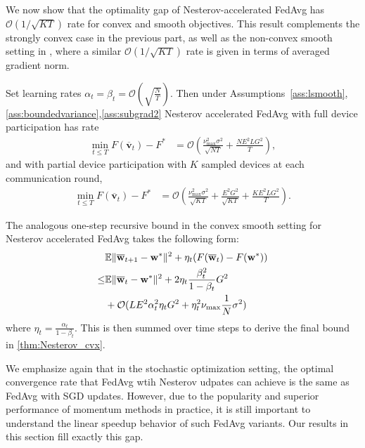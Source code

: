 We now show that the optimality gap of Nesterov-accelerated FedAvg has $\mathcal{O}(1/\sqrt{KT})$ rate for convex and smooth objectives. This result complements the strongly convex case in the previous
part, as well as the non-convex smooth setting in \cite{huo2020faster,yu2019linear,li2018federated},
where a similar $\mathcal{O}(1/\sqrt{KT})$ rate is given in terms
of averaged gradient norm. 
\begin{theorem}
	\label{thm:Nesterov_cvx}Set learning rates $\alpha_{t}=\beta_{t}=\mathcal{O}(\sqrt{\frac{N}{T}})$. Then under Assumptions~\ref{ass:lsmooth},\ref{ass:boundedvariance},\ref{ass:subgrad2} Nesterov accelerated FedAvg with
	full device participation has rate
	{\begin{align*}
		\min_{t\leq T}F(\overline{\mathbf{v}}_{t})-F^{\ast} & =\mathcal{O}\left(\frac{\nu_{\max}^{2}\sigma^{2}}{\sqrt{NT}}+\frac{NE^{2}LG^{2}}{T}\right),
		\end{align*}}
	and with partial device participation with $K$ sampled devices at
	each communication round, 
	{\begin{align*}
		\min_{t\leq T}F(\overline{\mathbf{v}}_{t})-F^{\ast} & =\mathcal{O}\left(\frac{\nu_{\max}^{2}\sigma^{2}}{\sqrt{KT}}+\frac{E^{2}G^{2}}{\sqrt{KT}}+\frac{KE^{2}LG^{2}}{T}\right).
		\end{align*}}
\end{theorem}

The analogous one-step recursive bound in the convex smooth setting for Nesterov accelerated FedAvg takes the following form: 
\begin{align*}
	&\mathbb{E}\|{\overline{\mathbf{w}}}_{t+1}-{\mathbf{w}}^{\ast}\|^{2}+\eta_{t}(F({\overline{\mathbf{w}}}_{t})-F({\mathbf{w}}^{\ast})) \\
	\leq & \mathbb{E}\|{\overline{\mathbf{w}}}_{t}-{\mathbf{w}}^{\ast}\|^{2}+2\eta_{t}\frac{\beta_{t}^{2}}{1-\beta_{t}}G^{2}\\
	& +\mathcal{O}(LE^{2}\alpha_{t}^{2}\eta_{t}G^{2}+\eta_{t}^{2}\nu_{\max}\frac{1}{N}\sigma^{2})
	\end{align*}
where $\eta_{t}=\frac{\alpha_{t}}{1-\beta_{t}}$. This is then summed over time steps to derive the final bound in \ref{thm:Nesterov_cvx}.

We emphasize again that in the stochastic optimization setting, the optimal convergence rate that FedAvg wtih Nesterov udpates can achieve is the same as FedAvg with SGD updates. However, due to the popularity and superior performance of momentum methods in practice, it is still important to understand the linear speedup behavior of such FedAvg variants. Our results in this section fill exactly this gap. 

